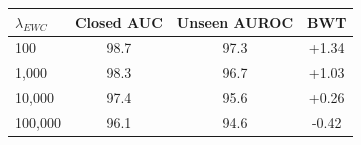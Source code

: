 \begin{tabular}{@{}lccc@{}}
\toprule
$\lambda_{EWC}$ & Closed AUC & Unseen AUROC & BWT \\
\midrule
100 & 98.7 & 97.3 & +1.34 \\
1{,}000 & 98.3 & 96.7 & +1.03 \\
10{,}000 & 97.4 & 95.6 & +0.26 \\
100{,}000 & 96.1 & 94.6 & -0.42 \\
\bottomrule
\end{tabular}
